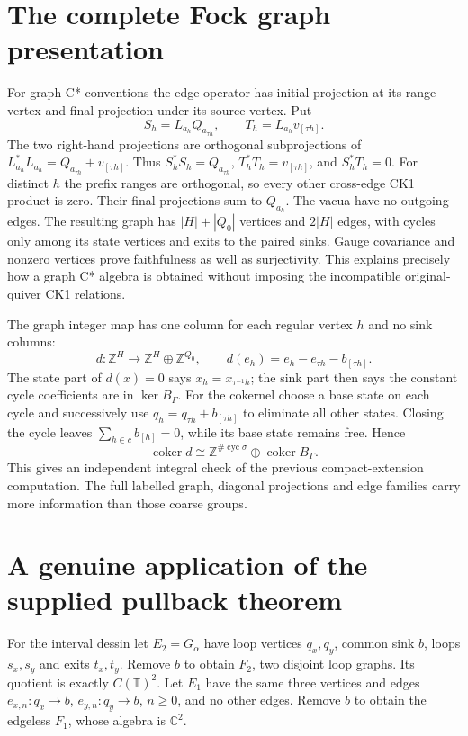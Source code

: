 \documentclass[11pt,oneside,openany]{book}
\theoremstyle{definition}\newtheorem{definition}[theorem]{Definition}
\theoremstyle{remark}\newtheorem{remark}[theorem]{Remark}
\newcommand{\C}{\mathbb C}\newcommand{\Z}{\mathbb Z}\newcommand{\R}{\mathbb R}
\begin{document}
\section{The complete Fock graph presentation}
For graph C* conventions the edge operator has initial projection at its range vertex and final projection under its source vertex. Put
\[
 S_h=L_{a_h}Q_{a_{\tau h}},\qquad T_h=L_{a_h}v_{[\tau h]}.
\]
The two right-hand projections are orthogonal subprojections of $L_{a_h}^*L_{a_h}=Q_{a_{\tau h}}+v_{[\tau h]}$. Thus $S_h^*S_h=Q_{a_{\tau h}}$, $T_h^*T_h=v_{[\tau h]}$, and $S_h^*T_h=0$. For distinct $h$ the prefix ranges are orthogonal, so every other cross-edge CK1 product is zero. Their final projections sum to $Q_{a_h}$. The vacua have no outgoing edges. The resulting graph has $|H|+|Q_0|$ vertices and $2|H|$ edges, with cycles only among its state vertices and exits to the paired sinks. Gauge covariance and nonzero vertices prove faithfulness as well as surjectivity. This explains precisely how a graph C* algebra is obtained without imposing the incompatible original-quiver CK1 relations.

The graph integer map has one column for each regular vertex $h$ and no sink columns:
\[
 d:\Z^H\longrightarrow\Z^H\oplus\Z^{Q_0},\qquad
 d(e_h)=e_h-e_{\tau h}-b_{[\tau h]}.
\]
The state part of $d(x)=0$ says $x_h=x_{\tau^{-1}h}$; the sink part then says the constant cycle coefficients are in $\ker B_\Gamma$. For the cokernel choose a base state on each cycle and successively use $q_h=q_{\tau h}+b_{[\tau h]}$ to eliminate all other states. Closing the cycle leaves $\sum_{h\in c}b_{[h]}=0$, while its base state remains free. Hence
\[
 \operatorname{coker}d\cong\Z^{\#\operatorname{cyc}\sigma}\oplus\operatorname{coker}B_\Gamma.
\]
This gives an independent integral check of the previous compact-extension computation. The full labelled graph, diagonal projections and edge families carry more information than those coarse groups.

\section{A genuine application of the supplied pullback theorem}
For the interval dessin let $E_2=G_\alpha$ have loop vertices $q_x,q_y$, common sink $b$, loops $s_x,s_y$ and exits $t_x,t_y$. Remove $b$ to obtain $F_2$, two disjoint loop graphs. Its quotient is exactly $C(\mathbb T)^2$. Let $E_1$ have the same three vertices and edges $e_{x,n}:q_x\to b$, $e_{y,n}:q_y\to b$, $n\ge0$, and no other edges. Remove $b$ to obtain the edgeless $F_1$, whose algebra is $\C^2$.
\end{document}

